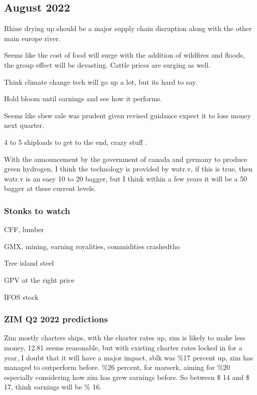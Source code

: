 \subsection{August 2022}

Rhine drying up should be a major supply chain disruption along with the other main europe river.

Seems like the cost of food will surge with the addition of wildfires and floods, the group effect will be devasting. Cattle prices are surging as well.

Think climate change tech will go up a lot, but its hard to say.

Hold bloom until earnings and see how it performs.

Seems like sbsw sale was prudent given revised guidance expect it to lose money next quarter.


4 to 5 shiploads to get to the end, crazy stuff \cite{youtube_2022}.

With the announcement by the government of canada and germany to produce green hydrogen, I think the technology is provided by watr.v, if this is true, then watr.v is an easy 10 to 20 bagger, but I think within a few years it will be a 50 bagger at these current levels.

\subsubsection{Stonks to watch}

CFF, lumber

GMX, mining, earning royalities, commidities crashedtho

Tree island steel

GPV at the right price

IFOS stock
\subsubsection{ZIM Q2 2022 predictions}

Zim mostly charters ships, with the charter rates up, zim is likely to make less money, 12.81 seems reasonable, but with existing charter rates locked in for a year, I doubt that it will have a major impact, sblk was \%17 percent up, zim has managed to outperform before. \%26 percent, for marserk, aiming for \%20 especially considering how zim has grew earnings before. So between \$ 14 and \$ 17, think earnings will be \% 16.


